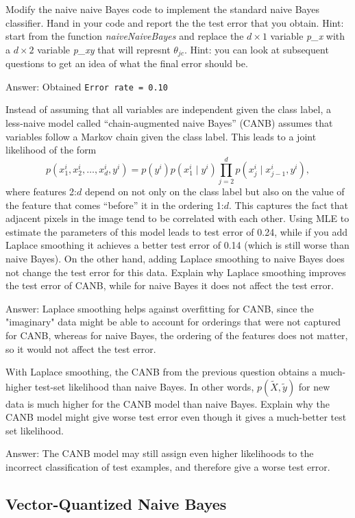 \documentclass{article}
\def\ans#1{\par\gre{Answer: #1}}
\def\blu#1{{\color{blu}#1}}
\def\gre#1{{\color{gre}#1}}
\def\cond{\; | \;}
\begin{document}
{\item Modify the naive naive Bayes code to implement the standard naive Bayes classifier. \blu{Hand in your code and report the the test error that you obtain}. Hint: start from the function \emph{naiveNaiveBayes} and replace the $d \times 1$ variable \emph{p\_x} with a $d \times 2$ variable \emph{p\_xy} that will represnt $\theta_{jc}$. Hint: you can look at subsequent questions to get an idea of what the final error should be.
\ans{
Obtained \texttt{Error rate = 0.10}

}
\pagebreak
\item Instead of assuming that all variables are independent given the class label, a less-naive model called ``chain-augmented naive Bayes'' (CANB) assumes that variables follow a Markov chain given the class label. This leads to a joint likelihood of the form
\[
p(x_1^i, x_2^i,\dots,x_d^i, y^i) = p(y^i)p(x_1^i \cond y^i)\prod_{j=2}^d p(x_j^i \cond x_{j-1}^i, y^i),
\]
where features 2:$d$ depend on not only on the class label but also on the value of the feature that comes ``before'' it in the ordering 1:$d$. This captures the fact that adjacent pixels in the image tend to be correlated with each other.
Using MLE to estimate the parameters of this model leads to test error of 0.24, while if you add Laplace smoothing it achieves a better test error of 0.14 (which is still worse than naive Bayes). On the other hand, adding Laplace smoothing to naive Bayes does not change the test error for this data. \blu{Explain why Laplace smoothing improves the test error of CANB, while for naive Bayes it does not affect the test error.}
\ans{
Laplace smoothing helps against overfitting for CANB, since the "imaginary" data might be able to account for orderings that were not captured for CANB, whereas for naive Bayes, the ordering of the features does not matter, so it would not affect the test error.
}
\item With Laplace smoothing, the CANB from the previous question obtains a much-higher test-set likelihood than naive Bayes. In other words, $p(\tilde{X}, \tilde{y})$ for new data is much higher for the CANB model than naive Bayes. \blu{Explain why the CANB model might give worse test error even though it gives a much-better test set likelihood.}
\ans{
The CANB model may still assign even higher likelihoods to the incorrect classification of test examples, and therefore give a worse test error.
}
}
\pagebreak

\subsection{Vector-Quantized Naive Bayes}
\end{document}
